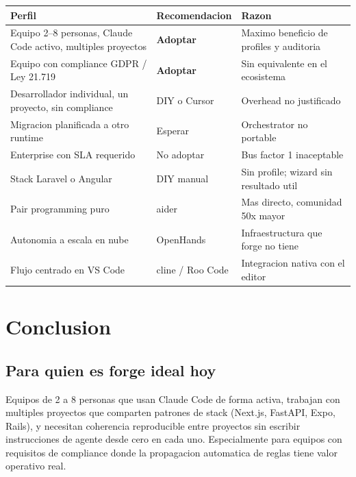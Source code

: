 \documentclass[12pt,a4paper]{article}
\begin{document}
\begin{center}
\begin{tabular}{L{5cm}L{3cm}L{5.5cm}}
  \toprule
  \textbf{Perfil} & \textbf{Recomendacion} & \textbf{Razon} \\
  \midrule
  Equipo 2--8 personas, Claude Code activo, multiples proyectos &
    \textcolor{okgreen}{\textbf{Adoptar}} &
    Maximo beneficio de profiles y auditoria \\
  \addlinespace
  Equipo con compliance GDPR / Ley 21.719 &
    \textcolor{okgreen}{\textbf{Adoptar}} &
    Sin equivalente en el ecosistema \\
  \addlinespace
  Desarrollador individual, un proyecto, sin compliance &
    \textcolor{warnorange}{DIY o Cursor} &
    Overhead no justificado \\
  \addlinespace
  Migracion planificada a otro runtime &
    \textcolor{warnorange}{Esperar} &
    Orchestrator no portable \\
  \addlinespace
  Enterprise con SLA requerido &
    \textcolor{criticalred}{No adoptar} &
    Bus factor 1 inaceptable \\
  \addlinespace
  Stack Laravel o Angular &
    \textcolor{criticalred}{DIY manual} &
    Sin profile; wizard sin resultado util \\
  \addlinespace
  Pair programming puro &
    \textcolor{warnorange}{aider} &
    Mas directo, comunidad 50x mayor \\
  \addlinespace
  Autonomia a escala en nube &
    \textcolor{warnorange}{OpenHands} &
    Infraestructura que forge no tiene \\
  \addlinespace
  Flujo centrado en VS Code &
    \textcolor{warnorange}{cline / Roo Code} &
    Integracion nativa con el editor \\
  \bottomrule
\end{tabular}
\end{center}

\section{Conclusion}

\subsection{Para quien es forge ideal hoy}

Equipos de 2 a 8 personas que usan Claude Code de forma activa, trabajan con multiples
proyectos que comparten patrones de stack (Next.js, FastAPI, Expo, Rails), y necesitan
coherencia reproducible entre proyectos sin escribir instrucciones de agente desde cero
en cada uno. Especialmente para equipos con requisitos de compliance donde la propagacion
automatica de reglas tiene valor operativo real.
\end{document}
